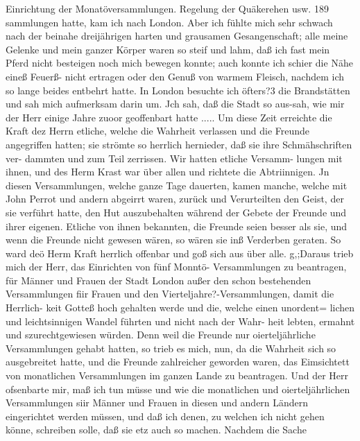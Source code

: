 Einrichtung der Monatöversammlungen. Regelung der Quäkerehen usw. 189
sammlungen hatte, kam ich nach London. Aber ich fühlte mich
sehr schwach nach der beinahe dreijährigen harten und grausamen
Gesangenschaft; alle meine Gelenke und mein ganzer Körper waren
so steif und lahm, daß ich fast mein Pferd nicht besteigen noch
mich bewegen konnte; auch konnte ich schier die Nähe eineß Feuerß-
nicht ertragen oder den Genuß von warmem Fleisch, nachdem ich
so lange beides entbehrt hatte. In London besuchte ich öfters?3
die Brandstätten und sah mich aufmerksam darin um. Jch sah,
daß die Stadt so aus-sah, wie mir der Herr einige Jahre zuoor
geoffenbart hatte .....
Um diese Zeit erreichte die Kraft dez Herrn etliche, welche
die Wahrheit verlassen und die Freunde angegriffen hatten; sie
strömte so herrlich hernieder, daß sie ihre Schmähschriften ver-
dammten und zum Teil zerrissen. Wir hatten etliche Versamm-
lungen mit ihnen, und des Herm Krast war über allen und richtete
die Abtriinnigen. Jn diesen Versammlungen, welche ganze Tage
dauerten, kamen manche, welche mit John Perrot und andern
abgeirrt waren, zurück und Verurteilten den Geist, der sie verführt
hatte, den Hut auszubehalten während der Gebete der Freunde
und ihrer eigenen. Etliche von ihnen bekannten, die Freunde
seien besser als sie, und wenn die Freunde nicht gewesen wären,
so wären sie inß Verderben geraten. So ward deö Herm Kraft
herrlich offenbar und goß sich aus über alle.
g,;Daraus trieb mich der Herr, das Einrichten von fünf Monntö-
Versammlungen zu beantragen, für Männer und Frauen der
Stadt London außer den schon bestehenden Versammlungen fiir
Frauen und den Vierteljahre?-Versammlungen, damit die Herrlich-
keit Gotteß hoch gehalten werde und die, welche einen unordent=
lichen und leichtsinnigen Wandel führten und nicht nach der Wahr-
heit lebten, ermahnt und szurechtgewiesen würden. Denn weil
die Freunde nur oierteljährliche Versammlungen gehabt hatten, so
trieb es mich, nun, da die Wahrheit sich so ausgebreitet hatte,
und die Freunde zahlreicher geworden waren, das Eimsichtett von
monatlichen Versammlungen im ganzen Lande zu beantragen.
Und der Herr ofsenbarte mir, maß ich tun müsse und wie die
monatlichen und oierteljährlichen Versammlungen siir Männer
und Frauen in diesen und andern Ländern eingerichtet werden
müssen, und daß ich denen, zu welchen ich nicht gehen könne,
schreiben solle, daß sie etz auch so machen. Nachdem die Sache

